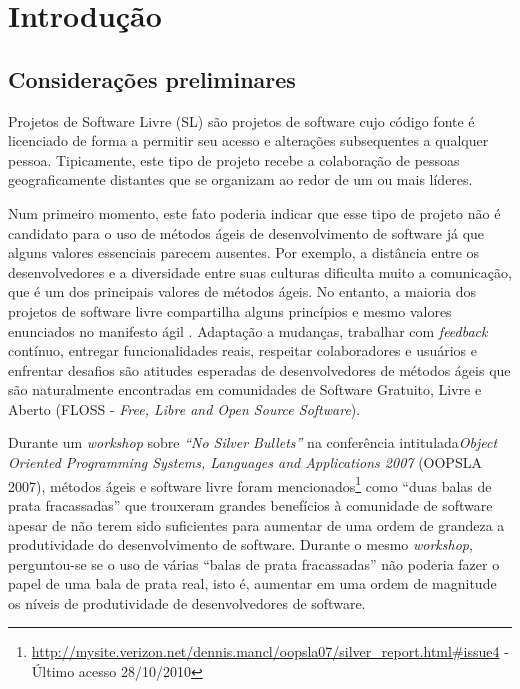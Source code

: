 \chapter{Introdução}
\label{cap:introducao}

\section{Considerações preliminares}
\label{sec:consideracoes_preliminares}

Projetos de Software Livre (SL) são projetos de software cujo código
fonte é licenciado de forma a permitir seu acesso e alterações
subsequentes a qualquer pessoa. Tipicamente, este tipo de projeto
recebe a colaboração de pessoas geograficamente distantes
\cite{Dempsey1999} que se organizam ao redor de um ou mais líderes.

Num primeiro momento, este fato poderia indicar que esse tipo de
projeto não é candidato para o uso de métodos ágeis de desenvolvimento
de software já que alguns valores essenciais parecem ausentes. Por
exemplo, a distância entre os desenvolvedores e a diversidade entre
suas culturas dificulta muito a comunicação, que é um dos principais
valores de métodos ágeis. No entanto, a maioria dos projetos de
software livre compartilha alguns princípios e mesmo valores
enunciados no manifesto ágil \cite{AgileManifesto}. Adaptação a
mudanças, trabalhar com \emph{feedback} contínuo, entregar
funcionalidades reais, respeitar colaboradores e usuários e enfrentar
desafios são atitudes esperadas de desenvolvedores de métodos ágeis
que são naturalmente encontradas em comunidades de Software Gratuito,
Livre e Aberto (FLOSS - \emph{Free, Libre and Open Source Software}).

Durante um \emph{workshop} \cite{OOPSLA07} sobre \emph{``No Silver
  Bullets''} \cite{Brooks1987} na conferência intitulada\emph{Object
  Oriented Programming Systems, Languages and Applications 2007}
(OOPSLA 2007), métodos ágeis e software livre foram
mencionados\footnote{\url{http://mysite.verizon.net/dennis.mancl/oopsla07/silver_report.html\#issue4}
  - Último acesso 28/10/2010} como ``duas balas de prata fracassadas''
que trouxeram grandes benefícios à comunidade de software apesar de
não terem sido suficientes para aumentar de uma ordem de grandeza a
produtividade do desenvolvimento de software. Durante o mesmo
\emph{workshop}, perguntou-se se o uso de várias ``balas de prata
fracassadas'' não poderia fazer o papel de uma bala de prata real,
isto é, aumentar em uma ordem de magnitude os níveis de produtividade
de desenvolvedores de software.

